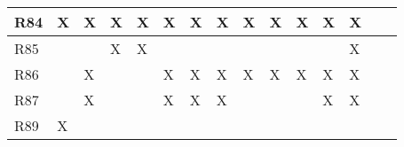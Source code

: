 \documentclass{article}
\begin{document}
\begin{tabular}{|l|l|l|l|l|l|l|l|l|l|l|l|l|l|l|}
R84 &X&X&X&X&X&X&X&X&X&X&X&X\\\hline
R85 &&&X&X&&&&&&&&X \\\hline
R86 &&X&&&X&X&X&X&X&X&X&X \\\hline
R87 &&X&&&X&X&X&&&&X&X \\\hline
R89 &X&&&&&&&&&&& \\\hline
\end{tabular}
\end{document}
